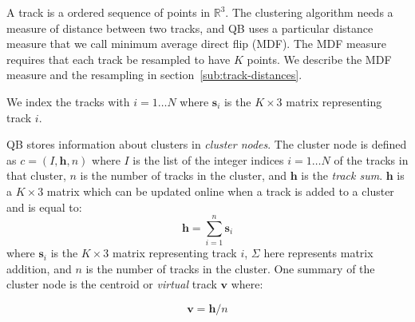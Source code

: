 \documentclass[journal]{IEEEtran}
\begin{document}
A track is a ordered sequence of points in $\mathbb{R}^{3}$.  The
clustering algorithm needs a measure of distance between two tracks, and
QB uses a particular distance measure that we call minimum average
direct flip (MDF).  The MDF measure requires that each track be
resampled to have $K$ points. We describe the MDF measure and the
resampling in section~\ref{sub:track-distances}.

We index the tracks with $i = 1 \dots N$ where $\mathbf{s}_{i}$ is the
$K\times3$ matrix representing track $i$.

QB stores information about clusters in \emph{cluster nodes}.  The
cluster node is defined as $c=(I,\mathbf{h},n)$ where $I$ is the list of
the integer indices $i = 1 \dots N$ of the tracks in that cluster, $n$
is the number of tracks in the cluster, and $\mathbf{h}$ is the \emph{track
  sum}. $\mathbf{h}$ is a $K \times3$ matrix which can be updated online
when a track is added to a cluster and is equal to:
\begin{equation}
  \mathbf{h}=\sum_{i=1}^{n}\mathbf{s}_{i}
\end{equation} 
where $\mathbf{s}_{i}$ is the $K\times3$ matrix representing track $i$,
$\Sigma$ here represents matrix addition, and $n$ is the number of
tracks in the cluster. One summary of the cluster node is the centroid or
\emph{virtual} track $\mathbf{v}$ where:

\begin{equation}
  \mathbf{v} = \mathbf{h} / n
\end{equation}
\end{document}

